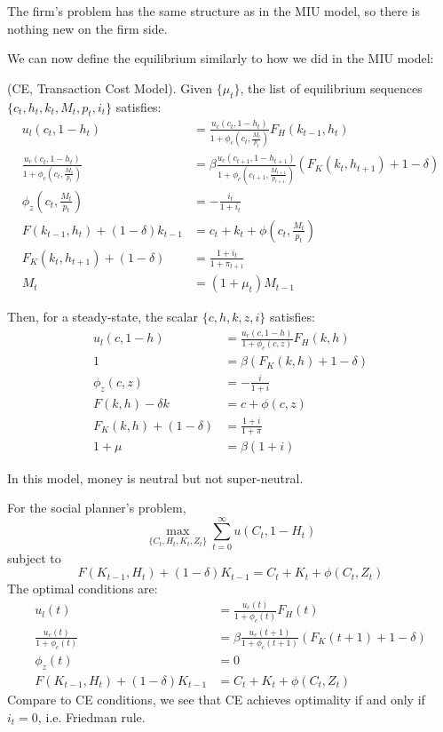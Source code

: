 \documentclass[12pt]{article}
\begin{document}
The firm's problem has the same structure as in the MIU model, so there is nothing new on the firm side.

We can now define the equilibrium similarly to how we did in the MIU model:
\begin{definition} (CE, Transaction Cost Model). 
	Given $\{\mu_t\}$, the list of equilibrium sequences $\{c_t, h_t, k_t, M_t, p_t, i_t\}$ satisfies:
	\begin{align}
		u_l(c_t, 1-h_t) &= \frac{u_c(c_t, 1-h_t)}{1 + \phi_c(c_t, \frac{M_t}{p_t})}F_H(k_{t-1}, h_t)\\
		\frac{u_c(c_t, 1-h_t)}{1 + \phi_c(c_t, \frac{M_t}{p_t})} &= \beta \frac{u_c(c_{t+1}, 1 - h_{t+1})}{1 + \phi_c(c_{t+1}, \frac{M_{t+1}}{p_{t+1}})}(F_K(k_{t}, h_{t+1}) + 1 - \delta)\\
		\phi_z(c_t, \frac{M_t}{p_t}) &= -\frac{i_t}{1+i_t}\\
		F(k_{t-1}, h_t) + (1-\delta) k_{t-1} &= c_t + k_t + \phi(c_t, \frac{M_t}{p_t})\\
		F_K(k_t, h_{t+1}) + (1-\delta) &= \frac{1 + i_t}{1 + \pi_{t+1}}\\
		M_t &= (1 + \mu_t) M_{t-1}
	\end{align}
\end{definition}

Then, for a steady-state, the scalar $\{c, h, k, z, i\}$ satisfies:
\begin{align}
	u_l(c, 1-h) &= \frac{u_c(c, 1-h)}{1 + \phi_c(c, z)}F_H(k, h)\\
	1 &= \beta (F_K(k, h) + 1 - \delta)\\
	\phi_z(c, z) &= -\frac{i}{1+i}\\
	F(k, h) -\delta k &= c + \phi(c, z)\\
	F_K(k, h) + (1-\delta) &= \frac{1 + i}{1 + \pi}\\
	1 + \mu &= \beta(1+i)
\end{align}
\begin{proposition}
	In this model, money is neutral but not super-neutral.
\end{proposition}

\noindent
For the social planner's problem,
\begin{equation*}
	\max_{\{C_t, H_t, K_t, Z_t\}} \sum_{t=0}^\infty u(C_t, 1-H_t)
\end{equation*}
subject to
\begin{equation}
	F(K_{t-1}, H_t) + (1-\delta) K_{t-1} = C_t + K_t + \phi(C_t, Z_t)
\end{equation}
The optimal conditions are:
\begin{align}
	u_l(t) &= \frac{u_c(t)}{1+\phi_c(t)}F_H(t)\\
	\frac{u_c(t)}{1 + \phi_c(t)} &= \beta \frac{u_c(t+1)}{1 + \phi_c(t+1)}(F_K(t+1) + 1-\delta)\\
	\phi_z(t) &= 0\\
	F(K_{t-1}, H_t) + (1-\delta) K_{t-1} &= C_t + K_t + \phi(C_t, Z_t)
\end{align}
Compare to CE conditions, we see that CE achieves optimality if and only if $i_t = 0$, i.e. Friedman rule.
\end{document}

